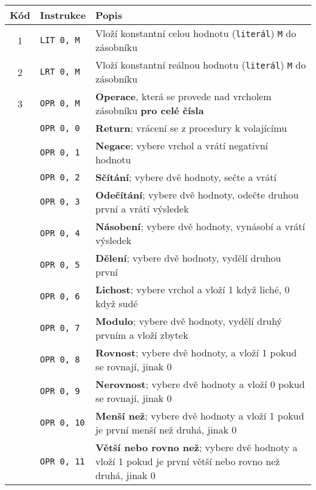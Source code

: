 \documentclass[
12pt,
a4paper,
pdftex,
czech
]{report}
\begin{document}
\begin{table}[]
\centering
\caption{Instrukce}
\label{instrukce}
\begin{longtable}{|c|l|p{10cm}|}
\hline
		Kód & Instrukce & Popis \\
\hline\hline
\rule{0pt}{3ex}1 & \texttt{LIT 0, M} & Vloží konstantní celou hodnotu (\texttt{literál}) \texttt{M} do zásobníku \\ \hline
\rule{0pt}{3ex}2 & \texttt{LRT 0, M} & Vloží konstantní reálnou hodnotu (\texttt{literál}) \texttt{M} do zásobníku \\ \hline
\rule{0pt}{3ex}3 & \texttt{OPR 0, M} & \textbf{Operace}, která se provede nad vrcholem zásobníku \textbf{pro celé čísla} \\ \hline
\rule{0pt}{3ex} & \texttt{OPR 0, 0} & \textbf{Return}; vrácení se z procedury k volajícímu \\ \hline
\rule{0pt}{3ex} & \texttt{OPR 0, 1} & \textbf{Negace}; vybere vrchol a vrátí negativní hodnotu \\ \hline
\rule{0pt}{3ex} & \texttt{OPR 0, 2} & \textbf{Sčítání}; vybere dvě hodnoty, sečte a vrátí \\ \hline
\rule{0pt}{3ex} & \texttt{OPR 0, 3} & \textbf{Odečítání}; vybere dvě hodnoty, odečte druhou první a vrátí výsledek \\ \hline
\rule{0pt}{3ex} & \texttt{OPR 0, 4} & \textbf{Násobení}; vybere dvě hodnoty, vynásobí a vrátí výsledek \\ \hline
\rule{0pt}{3ex} & \texttt{OPR 0, 5} & \textbf{Dělení}; vybere dvě hodnoty, vydělí druhou první \\ \hline
\rule{0pt}{3ex} & \texttt{OPR 0, 6} & \textbf{Lichost}; vybere vrchol a vloží 1 když liché, 0 když sudé \\ \hline
\rule{0pt}{3ex} & \texttt{OPR 0, 7} & \textbf{Modulo}; vybere dvě hodnoty, vydělí druhý prvním a vloží zbytek \\ \hline
\rule{0pt}{3ex} & \texttt{OPR 0, 8} & \textbf{Rovnost}; vybere dvě hodnoty, a vloží 1 pokud se rovnají, jinak 0 \\ \hline
\rule{0pt}{3ex} & \texttt{OPR 0, 9} & \textbf{Nerovnost}; vybere dvě hodnoty a vloží 0 pokud se rovnají, jinak 0 \\ \hline
\rule{0pt}{3ex} & \texttt{OPR 0, 10} & \textbf{Menší než}; vybere dvě hodnoty a vloží 1 pokud je první menší než druhá, jinak 0 \\ \hline
\rule{0pt}{3ex} & \texttt{OPR 0, 11} & \textbf{Větší nebo rovno než}; vybere dvě hodnoty a vloží 1 pokud je první větší nebo rovno než druhá, jinak 0 \\ \hline

\end{longtable}
\end{table}
\end{document}
